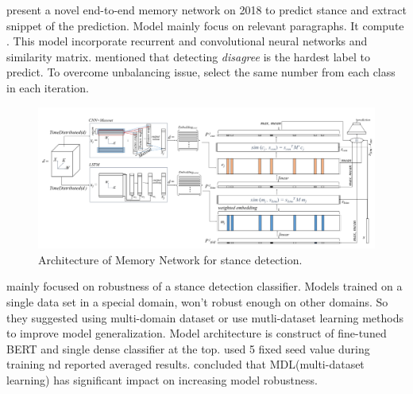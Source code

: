 	\cite{memory_network} present a novel end-to-end memory network on 2018 to predict stance and extract snippet of the prediction. Model mainly focus on relevant paragraphs. It compute . This model incorporate recurrent and convolutional neural networks and similarity matrix. \cite{memory_network} mentioned that detecting \emph{disagree} is the hardest label to predict. To overcome unbalancing issue, \cite{memory_network} select the same number from each class in each iteration. 
	\begin{figure}
		\centering
		\includegraphics[scale=0.25]{statistics/stance/memoty_network.png}
		\caption{Architecture of Memory Network for stance detection.}
		\label{fig:mem_network}
	\end{figure}

	\cite{stance_robust} mainly focused on robustness of a stance detection classifier. Models trained on a single data set in a special domain, won't robust enough on other domains. So they suggested using multi-domain dataset or use mutli-dataset learning methods to improve model generalization. Model architecture is construct of fine-tuned BERT\cite{bert} and single dense classifier at the top. \cite{stance_robust} used 5 fixed seed value during training nd reported averaged results. \cite{stance_robust} concluded that MDL(multi-dataset learning) has significant impact on increasing model robustness.
	
